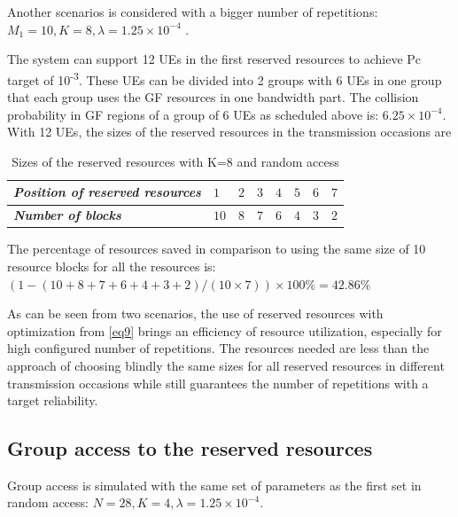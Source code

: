 \documentclass[conference]{IEEEtran}
\begin{document}
Another scenarios is considered with a bigger number of repetitions: $M_1=10, K=8, \lambda=1.25\times10^{-4}$ .

The system can support 12 UEs in the first reserved resources to achieve Pc target of 10\textsuperscript{-3}. These UEs can be divided into 2 groups with 6 UEs in one group that each group uses the GF resources in one bandwidth part. The collision probability in GF regions of a group of 6 UEs as scheduled above is: $6.25\times10^{-4}$.
With 12 UEs, the sizes of the reserved resources in the transmission occasions are

\begin{table}[htbp]
\caption{Sizes of the reserved resources with K=8 and random access}
\begin{center}
\begin{tabular}{|p{5em}|p{2em}|p{2em}|p{2em}|p{2em}|p{2em}|p{2em}|p{2em}|}
 \hline
 \textbf{\textit{Position of reserved resources}} & $1$ &$2$ &$3$ & $4$ &$5$ &$6$ &$7$\\ 
 \hline
 \textbf{\textit{Number of blocks}} & $10$ &$8$ &$7$ & $6$ &$4$ &$3$ &$2$\\

 
 \hline
\end{tabular}
\label{tab2}
\end{center}
\end{table}

The percentage of resources saved in comparison to using the same size of 10 resource blocks for all the resources is: $(1 - (10+8+7+6+4+3+2)/(10\times7)) \times100\% = 42.86\%$

As can be seen from two scenarios, the use of reserved resources with optimization from \eqref{eq9} brings an efficiency of resource utilization, especially for high configured number of repetitions. The resources needed are less than the approach of choosing blindly the same sizes for all reserved resources in different transmission occasions while still guarantees the number of repetitions with a target reliability.

\subsection{Group access to the reserved resources}\label{IIIBB}
Group access is simulated with the same set of parameters as the first set in random access: $N = 28, K = 4, \lambda = 1.25\times10^{-4}$.
\end{document}
